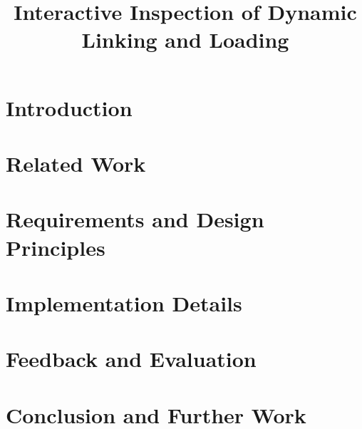 \documentclass[conference]{IEEEtran}
\begin{document}
\title{Interactive Inspection of Dynamic Linking and Loading}

\author{
\and
{}
}

\maketitle

\begin{abstract}

\end{abstract}

\section{Introduction}
\label{sec:introduction}


\section{Related Work}
\label{sec:related-work}


\section{Requirements and Design Principles}
\label{sec:design}


\section{Implementation Details}
\label{sec:implementation}


\section{Feedback and Evaluation}
\label{sec:evaluation}


\section{Conclusion and Further Work}
\label{sec:conclusion}




\end{document}
